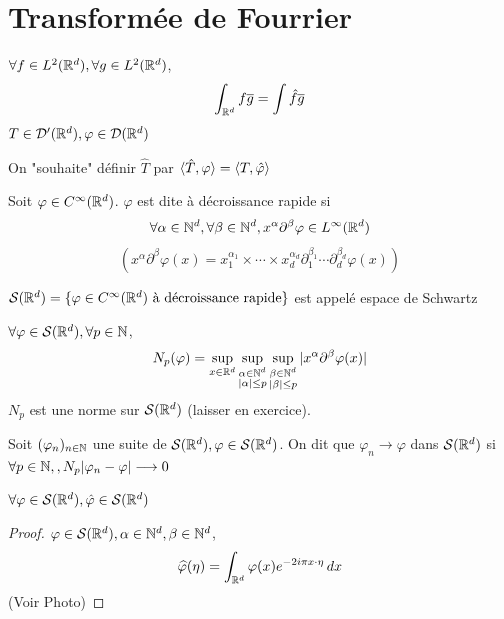 \documentclass[]{report}
\begin{document}
    \section{Transformée de Fourrier}

    \begin{ra}{}{}
        $\forall f\in L^2(\mathbb{R}^d),\forall g\in L^2(\mathbb{R}^d)$,
        \[\int_{\mathbb{R}^d} f\overline{g}=\int \hat{f}\overline{g}\]
        $T\in \mathcal{D}'(\mathbb{R}^d),\varphi\in \mathcal{D}(\mathbb{R}^d)$\\
    \end{ra}
    On "souhaite" définir $\hat{T}$ par $\langle \hat{T},\varphi \rangle=\langle T,\hat{\varphi} \rangle$
    
    \begin{df}{}{}
        Soit $\varphi\in C^\infty(\mathbb{R}^d)$. $\varphi$ est dite à décroissance rapide si
        \[\forall \alpha\in \mathbb{N}^d,\forall \beta\in \mathbb{N}^d,x^\alpha\partial^\beta \varphi\in L^\infty(\mathbb{R}^d)\]
        \[(x^\alpha \partial^\beta \varphi (x)=x_1^{\alpha_1}\times\cdots\times x_d^{\alpha_d}\partial_1^{\beta_1}\cdots\partial_d^{\beta_d}\varphi(x))\]
    \end{df}

    \begin{nt}{}{}
        $\mathcal{S}(\mathbb{R}^d)=\{\varphi\in C^\infty(\mathbb{R}^d)\text{ à décroissance rapide}\}$ est appelé espace de Schwartz
    \end{nt}

    \begin{df}{}{}
        $\forall \varphi\in \mathcal{S}(\mathbb{R}^d),\forall p\in \mathbb{N}$,
        \[N_p(\varphi)=\sup_{x\in \mathbb{R}^d}\sup_{\substack{\alpha \in \mathbb{N}^d\\ |\alpha|\le p}}\sup_{\substack{\beta\in \mathbb{N}^d\\ |\beta|\le p}}|x^{\alpha} \partial^\beta \varphi(x)|\]
        $N_p$ est une norme sur $\mathcal{S}(\mathbb{R}^d)$ (laisser en exercice).
    \end{df}

    \begin{df}{}{}
        Soit $(\varphi_n)_{{n\in\mathbb{N}}}$ une suite de $\mathcal{S}(\mathbb{R}^d),\varphi\in \mathcal{S}(\mathbb{R}^d)$. On dit que $\varphi_n\longrightarrow\varphi$ dans $\mathcal{S}(\mathbb{R}^d)$ si $\forall p\in \mathbb{N},,N_p|\varphi_n-\varphi|\longrightarrow 0$
    \end{df}

    \begin{prop}{}{}
        $\forall \varphi \in \mathcal{S}(\mathbb{R}^d),\hat{\varphi}\in \mathcal{S}(\mathbb{R}^d)$
    \end{prop}

    \begin{proof}
        $\varphi\in \mathcal{S}(\mathbb{R}^d),\alpha\in \mathbb{N}^d,\beta\in \mathbb{N}^d$,
        \[\widehat{\varphi}(\eta)=\int_{\mathbb{R}^d} \varphi(x)e^{-2i\pi x\cdot \eta}\, dx\]
        (Voir Photo)
    \end{proof}
\end{document}
